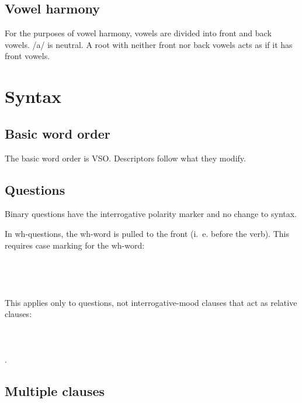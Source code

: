 \documentclass{book}
\begin{document}
\section{Vowel harmony}

For the purposes of vowel harmony, vowels are divided into front and back vowels. /a/ is neutral. A root with neither front nor back vowels acts as if it has front vowels.

\chapter{Syntax}

\section{Basic word order}

The basic word order is VSO. Descriptors follow what they modify.

\section{Questions}

Binary questions have the interrogative polarity marker and no change to syntax.

In wh-questions, the wh-word is pulled to the front (i.~e. before the verb). This requires case marking for the wh-word: \\
~\\
 \\
   \\
    \\

This applies only to questions, not interrogative-mood clauses that act as relative clauses: \\
~\\
 \\
     \\
    .

\section{Multiple clauses}
\end{document}
